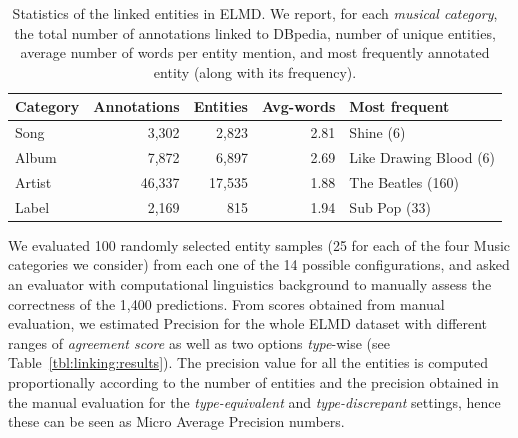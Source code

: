 \begin{table}[ht!]
\scriptsize
\small
\centering
\def\arraystretch{1.2}
	\begin{tabular}{|l|r|r|r|l|}
\hline
\textbf{Category} & \textbf{Annotations} & \textbf{Entities} & \textbf{Avg-words} & \textbf{Most frequent} \\
\hline
Song & 3,302 & 2,823 & 2.81 & Shine (6) \\
Album & 7,872 & 6,897 & 2.69 & Like Drawing Blood (6) \\
Artist & 46,337 & 17,535 & 1.88 & The Beatles (160) \\
Label & 2,169 & 815 & 1.94 & Sub Pop (33) \\
\hline
	\end{tabular}
	\caption{Statistics of the linked entities in ELMD. We report, for each \textit{musical category}, the total number of annotations linked to DBpedia, number of unique entities, average number of words per entity mention, and most frequently annotated entity (along with its frequency).}
	\label{tbl:linking:statistics}
\end{table}


We evaluated 100 randomly selected entity samples (25 for each of the four Music categories we consider) from each one of the 14 possible configurations, and asked an eva\-luator with computational linguistics background to manually assess the correctness of the 1,400 predictions. From scores obtained from manual evaluation, we estimated Precision for the whole \textsc{ELMD} dataset with different ranges of \textit{agreement score} as well as two options \textit{type}-wise (see Table~\ref{tbl:linking:results}). The precision value for all the entities is computed proportionally according to the number of entities and the precision obtained in the manual evaluation for the \textit{type-equivalent} and \textit{type-discrepant} settings, hence these can be seen as Micro Average Precision numbers.

